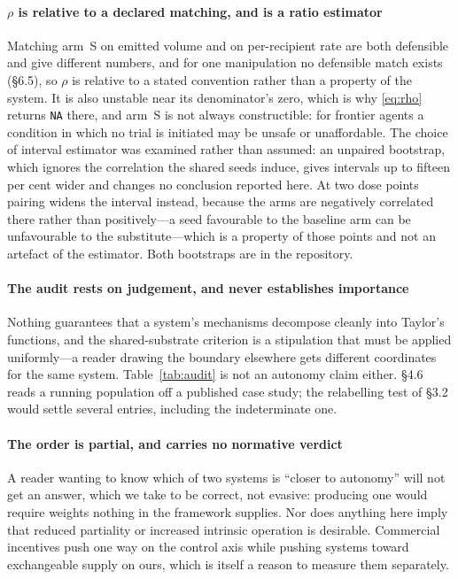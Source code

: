 \documentclass[review,3p,times]{elsarticle}
\begin{document}
\paragraph{\texorpdfstring{$\rho$}{rho} is relative to a declared matching, and is a ratio estimator}
Matching arm~S on emitted volume and on per-recipient rate are both defensible
and give different numbers, and for one manipulation no defensible match
exists (\S6.5), so $\rho$ is relative to a stated convention rather than a
property of the system. It is also unstable near its denominator's zero, which
is why \eqref{eq:rho} returns \texttt{NA} there, and arm~S is not always
constructible: for frontier agents a condition in which no trial is initiated
may be unsafe or unaffordable. The choice of interval estimator was examined
rather than assumed: an unpaired bootstrap, which ignores the correlation the
shared seeds induce, gives intervals up to fifteen per cent wider and changes
no conclusion reported here. At two dose points pairing widens the interval
instead, because the arms are negatively correlated there rather than
positively---a seed favourable to the baseline arm can be unfavourable to the
substitute---which is a property of those points and not an artefact of the
estimator. Both bootstraps are in the repository.

\paragraph{The audit rests on judgement, and never establishes importance}
Nothing guarantees that a system's mechanisms decompose cleanly into Taylor's
functions, and the shared-substrate criterion is a stipulation that must be
applied uniformly---a reader drawing the boundary elsewhere gets different
coordinates for the same system. Table~\ref{tab:audit} is not an autonomy
claim either. \S4.6 reads a running population off a published case study;
the relabelling test of \S3.2 would settle several entries, including the
indeterminate one.

\paragraph{The order is partial, and carries no normative verdict}
A reader wanting to know which of two systems is ``closer to autonomy'' will
not get an answer, which we take to be correct, not evasive: producing
one would require weights nothing in the framework supplies. Nor does anything
here imply that reduced partiality or increased intrinsic operation is
desirable. Commercial incentives push one way on the control axis while
pushing systems toward exchangeable supply on ours, which is itself a reason
to measure them separately.
\end{document}
